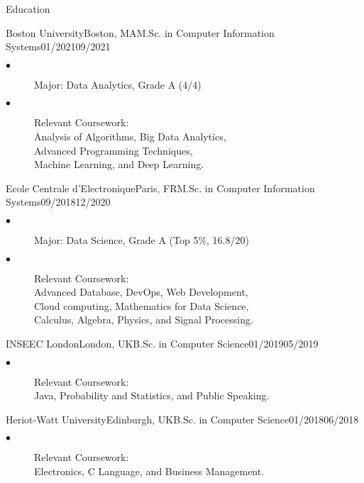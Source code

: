 \documentclass{resume}
\begin{document}
	\begin{multicols}{2}

	\begin{rSection}{\Large Education}
		\begin{school}{Boston University}{Boston, MA}{M.Sc. in Computer Information Systems}{01/2021}{09/2021}{
			\begin{description}
				\item[$\bullet$]Major:  Data Analytics, Grade A (4/4)
				\item[$\bullet$]{Relevant Coursework: \\
				Analysis of Algorithms, Big Data Analytics, \\
				Advanced Programming Techniques,  \\
				Machine Learning, and Deep Learning.}
			\end{description}
		}
		\end{school}
		
		\begin{school}{Ecole Centrale d'Electronique}{Paris, FR}{M.Sc. in Computer Information Systems}{09/2018}{12/2020}{
			\begin{description}
				\item[$\bullet$]Major: Data Science, Grade A  (Top 5\%, 16.8/20)
				\item[$\bullet$]{Relevant Coursework: \\
				Advanced Database, DevOps, Web Development,\\
				Cloud computing, Mathematics for Data Science,\\
				Calculus, Algebra, Physics, and Signal Processing.}
			\end{description}
		}
		\end{school}
		\begin{school}{INSEEC London}{London, UK}{B.Sc. in Computer Science}{01/2019}{05/2019}{
			\begin{description}
				\item[$\bullet$]{Relevant Coursework: \\
				Java, Probability and Statistics, and Public Speaking.}
			\end{description}
		}
		\end{school}
		\begin{school}{Heriot-Watt University}{Edinburgh, UK}{B.Sc. in Computer Science}{01/2018}{06/2018}{
			\begin{description}
				\item[$\bullet$]{Relevant Coursework: \\
				Electronics, C Language, and Business Management.}
			\end{description}
		}
		\end{school}
	\end{rSection}


\end{multicols}
\end{document}
